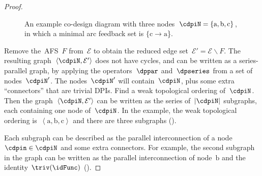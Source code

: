 \begin{proof}
\begin{figure}[H]
{\begin{centering}
\par\end{centering}

}

\caption{An example co-design diagram with three nodes~$\cdpiN=\{\text{a},\text{b},\text{c}\}$,
in which a minimal arc feedback set is $\{\text{c}\rightarrow\text{a}$\}.}
\end{figure}

Remove the~AFS~$F$ from~$\mathcal{E}$ to obtain the reduced edge
set~$\mathcal{E}'=\mathcal{E}\backslash F$.  The resulting graph~$\left\langle \cdpiN,\mathcal{E}'\right\rangle $
does not have cycles, and can be written as a series-parallel graph,
by applying the operators~$\dppar$ and~$\dpseries$ from a set
of nodes~$\cdpiN'$. The nodes~$\cdpiN'$ will contain~$\cdpiN$,
plus some extra ``connectors'' that are trivial DPIs. Find a weak
topological ordering of~$\cdpiN$. Then the graph~$\left\langle \cdpiN,\mathcal{E}'\right\rangle $
can be written as the series of~$|\cdpiN|$ subgraphs, each containing
one node of~$\cdpiN$. In the example, the weak topological ordering
is~$\left\langle \text{a},\text{b},\text{c}\right\rangle $ and there
are three subgraphs (). 


\noindent Each subgraph can be described as the parallel interconnection
of a node~$\cdpin\in\cdpiN$ and some extra connectors. For example,
the second subgraph in the graph can be written as the parallel interconnection
of node~$\text{b}$ and the identity $\triv(\idFunc)$ ().



\end{proof}
